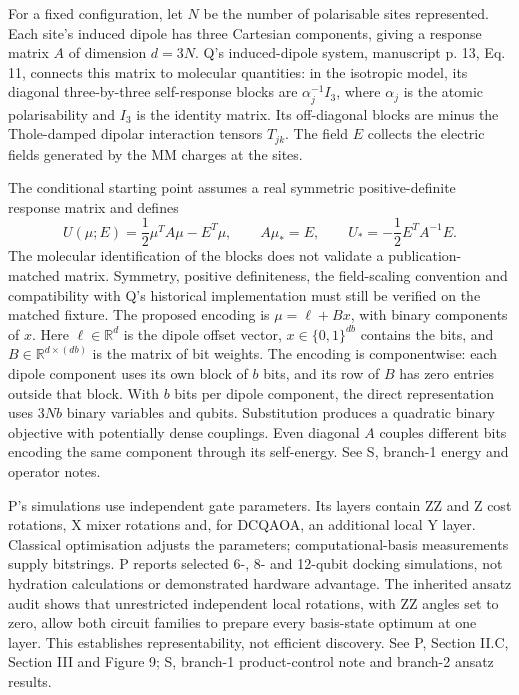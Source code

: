 \documentclass{article}
\begin{document}
For a fixed configuration, let $N$ be the number of polarisable sites represented. Each site's induced dipole has three Cartesian components, giving a response matrix $A$ of dimension $d=3N$. Q's induced-dipole system, manuscript p. 13, Eq. 11, connects this matrix to molecular quantities: in the isotropic model, its diagonal three-by-three self-response blocks are $\alpha_j^{-1}I_3$, where $\alpha_j$ is the atomic polarisability and $I_3$ is the identity matrix. Its off-diagonal blocks are minus the Thole-damped dipolar interaction tensors $T_{jk}$. The field $E$ collects the electric fields generated by the MM charges at the sites.

The conditional starting point assumes a real symmetric positive-definite response matrix and defines
\begin{equation}
U(\mu;E)=\frac12\mu^TA\mu-E^T\mu,\qquad A\mu_*=E,\qquad U_*=-\frac12E^TA^{-1}E.
\end{equation}
The molecular identification of the blocks does not validate a publication-matched matrix. Symmetry, positive definiteness, the field-scaling convention and compatibility with Q's historical implementation must still be verified on the matched fixture. The proposed encoding is $\mu=\ell+Bx$, with binary components of $x$. Here $\ell\in\mathbb R^d$ is the dipole offset vector, $x\in\{0,1\}^{db}$ contains the bits, and $B\in\mathbb R^{d\times(db)}$ is the matrix of bit weights. The encoding is componentwise: each dipole component uses its own block of $b$ bits, and its row of $B$ has zero entries outside that block. With $b$ bits per dipole component, the direct representation uses $3Nb$ binary variables and qubits. Substitution produces a quadratic binary objective with potentially dense couplings. Even diagonal $A$ couples different bits encoding the same component through its self-energy. See S, branch-1 energy and operator notes.

P's simulations use independent gate parameters. Its layers contain ZZ and Z cost rotations, X mixer rotations and, for DCQAOA, an additional local Y layer. Classical optimisation adjusts the parameters; computational-basis measurements supply bitstrings. P reports selected 6-, 8- and 12-qubit docking simulations, not hydration calculations or demonstrated hardware advantage. The inherited ansatz audit shows that unrestricted independent local rotations, with ZZ angles set to zero, allow both circuit families to prepare every basis-state optimum at one layer. This establishes representability, not efficient discovery. See P, Section II.C, Section III and Figure 9; S, branch-1 product-control note and branch-2 ansatz results.
\end{document}
